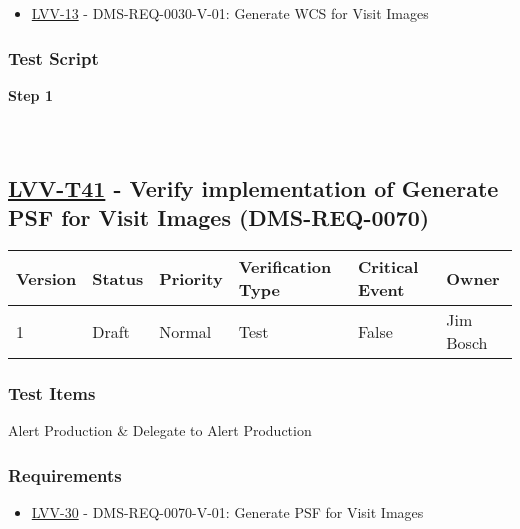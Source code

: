 \begin{itemize}
\tightlist
\item
  \href{https://jira.lsstcorp.org/browse/LVV-13}{LVV-13} -
  DMS-REQ-0030-V-01: Generate WCS for Visit Images
\end{itemize}

\hypertarget{test-script-130}{%
\subsubsection{Test Script}\label{test-script-130}}

\textbf{Step 1}\\
~\\
~\\

\hypertarget{lvv-t41---verify-implementation-of-generate-psf-for-visit-images-dms-req-0070}{%
\subsection{\texorpdfstring{\href{https://jira.lsstcorp.org/secure/Tests.jspa\#/testCase/LVV-T41}{LVV-T41}
- Verify implementation of Generate PSF for Visit Images
(DMS-REQ-0070)}{LVV-T41 - Verify implementation of Generate PSF for Visit Images (DMS-REQ-0070)}}\label{lvv-t41---verify-implementation-of-generate-psf-for-visit-images-dms-req-0070}}

\begin{longtable}[]{@{}llllll@{}}
\toprule
Version & Status & Priority & Verification Type & Critical Event &
Owner\tabularnewline
\midrule
\endhead
1 & Draft & Normal & Test & False & Jim Bosch\tabularnewline
\bottomrule
\end{longtable}

\hypertarget{test-items-130}{%
\subsubsection{Test Items}\label{test-items-130}}

Alert Production \& Delegate to Alert Production

\hypertarget{requirements-131}{%
\subsubsection{Requirements}\label{requirements-131}}

\begin{itemize}
\tightlist
\item
  \href{https://jira.lsstcorp.org/browse/LVV-30}{LVV-30} -
  DMS-REQ-0070-V-01: Generate PSF for Visit Images
\end{itemize}

